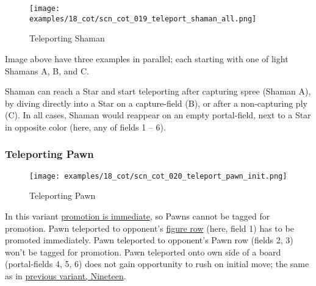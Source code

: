 \vspace*{-1.4\baselineskip}
\noindent
\begin{figure}[!h]
\texttt{[image: examples/18\_cot/scn\_cot\_019\_teleport\_shaman\_all.png]}
\vspace*{-1.4\baselineskip}
\caption{Teleporting Shaman}
\label{fig:scn_cot_019_teleport_shaman_all}
\end{figure}

\vspace*{-0.4\baselineskip}
Image above have three examples in parallel; each starting with one of light
Shamans A, B, and C.

Shaman can reach a Star and start teleporting after capturing spree (Shaman A),
by diving directly into a Star on a capture-field (B), or after a non-capturing
ply (C). In all cases, Shaman would reappear on an empty portal-field, next to a
Star in opposite color (here, any of fields 1 -- 6).

\clearpage %

\subsubsection*{Teleporting Pawn}
\label{sec:Conquest of Tlalocan/Shaman/Movement/Teleporting Pawn}

\vspace*{-1.4\baselineskip}
\noindent
\begin{figure}[!h]
\texttt{[image: examples/18\_cot/scn\_cot\_020\_teleport\_pawn\_init.png]}
\vspace*{-1.4\baselineskip}
\caption{Teleporting Pawn}
\label{fig:scn_cot_020_teleport_pawn_init}
\end{figure}

\vspace*{-0.4\baselineskip}
In this variant
\hyperref[sec:Conquest of Tlalocan/Promotion]{promotion is immediate}, so Pawns
cannot be tagged for promotion.
Pawn teleported to opponent's \hyperref[sec:Terms/Figure row]{figure row} (here,
field 1) has to be promoted immediately. Pawn teleported to opponent's Pawn row
(fields 2, 3) won't be tagged for promotion. \newline
\indent
Pawn teleported onto own side of a board (portal-fields 4, 5, 6) does not gain
opportunity to rush on initial move; the same as in
\hyperref[fig:scn_n_12_teleport_pawns_step_1]{previous variant, Nineteen}.

